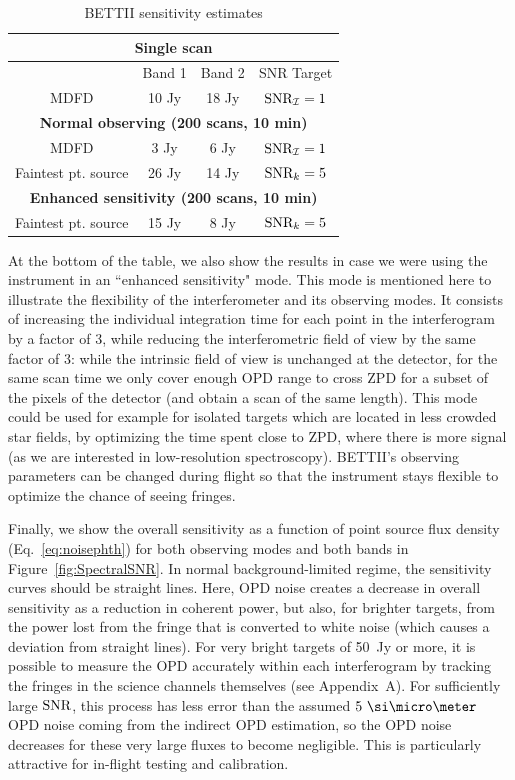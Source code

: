 \begin{table}[ht!]
\begin{center}
\begin{longtable}{cccc}
\toprule \multicolumn{4}{|c|}{\textbf{Single scan}} \\
\midrule 
     & Band 1 &  Band 2 & SNR Target \\
\midrule
MDFD & 10 Jy  & 18 Jy & $\textrm{SNR}_{\mathcal{I}} = 1$\\ 
\midrule
\multicolumn{4}{|c|}{\textbf{Normal observing (200 scans, 10 min)}} \\
\midrule
MDFD & 3 Jy  & 6 Jy & $\textrm{SNR}_{\mathcal{I}} = 1$\\ 
\midrule
Faintest pt. source & 26 Jy  & 14 Jy & $\textrm{SNR}_k = 5$\\ 
\midrule
\multicolumn{4}{|c|}{\textbf{Enhanced sensitivity (200 scans, 10 min)}} \\
\midrule
Faintest pt. source & 15 Jy  & 8 Jy & $\textrm{SNR}_k = 5$\\ 
\bottomrule 
\end{longtable} 
\caption{BETTII sensitivity estimates}
\label{tab:sensitivity}
\end{center}
\end{table} 


At the bottom of the table, we also show the results in case we were using the instrument in an ``enhanced sensitivity" mode. This mode is mentioned here to illustrate the flexibility of the interferometer and its observing modes. It consists of increasing the individual integration time for each point in the interferogram by a factor of 3, while reducing the interferometric field of view by the same factor of 3: while the intrinsic field of view is unchanged at the detector, for the same scan time we only cover enough OPD range to cross ZPD for a subset of the pixels of the detector (and obtain a scan of the same length). This mode could be used for example for isolated targets which are located in less crowded star fields, by optimizing the time spent close to ZPD, where there is more signal (as we are interested in low-resolution spectroscopy). BETTII's observing parameters can be changed during flight so that the instrument stays flexible to optimize the chance of seeing fringes.

Finally, we show the overall sensitivity as a function of point source flux density (Eq.~\ref{eq:noisephth}) for both observing modes and both bands in Figure~\ref{fig:SpectralSNR}. In normal background-limited regime, the sensitivity curves should be straight lines. Here, OPD noise creates a decrease in overall sensitivity as a reduction in coherent power, but also, for brighter targets, from the power lost from the fringe that is converted to white noise (which causes a deviation from straight lines). For very bright targets of 50~Jy or more, it is possible to measure the OPD accurately within each interferogram by tracking the fringes in the science channels themselves (see Appendix~A). For sufficiently large $\textrm{SNR}$, this process has less error than the assumed $5~\um$ OPD noise coming from the indirect OPD estimation, so the OPD noise decreases for these very large fluxes to become negligible. This is particularly attractive for in-flight testing and calibration.

